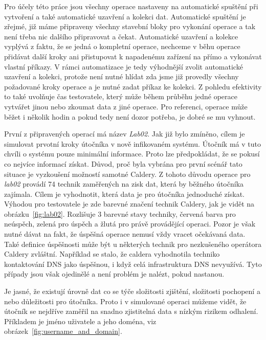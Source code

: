 Pro účely této práce jsou všechny operace nastaveny na automatické spuštění při vytvoření a také automatické uzavření a kolekci dat.
Automatické spuštění je zřejmé, již máme připraveny všechny stavební bloky pro vykonání operace a tak není třeba nic dalšího připravovat a čekat.
Automatické uzavření a kolekce vyplývá z faktu, že se jedná o kompletní operace, nechceme v běhu operace přidávat další kroky ani přistupovat k napadenému zařízení na přímo a vykonávat vlastní příkazy.
V rámci automatizace je tedy výhodnější zvolit automatické uzavření a kolekci, protože není nutné hlídat zda jsme již provedly všechny požadované kroky operace a je nutné zadat příkaz ke kolekci.
Z pohledu efektivity to také uvolňuje čas testovatele, který může během průběhu jedné operace vytvářet jinou nebo zkoumat data z jiné operace.
Pro referenci, operace může běžet i několik hodin a pokud tedy není dozor potřeba, je dobré se mu vyhnout.

První z připravených operací má název \textit{Lab02}.
Jak již bylo zmíněno, cílem je simulovat prvotní kroky útočníka v nově infikovaném systému.
Útočník má v tuto chvíli o systému pouze minimální informace.
Proto lze předpokládat, že se pokusí co nejvíce informací získat.
Důvod, proč byla vybrána pro první scénář tato situace je vyzkoušení možností samotné Caldery.
Z tohoto důvodu operace pro \textit{lab02} provádí 74 technik zaměřených na zisk dat, která by běžného útočníka zajímala.
Cílem je vyhodnotit, která data je pro útočníka jednoduché získat.
Výhodou pro testovatele je zde barevné značení technik Caldery, jak je vidět na obrázku~\ref{fig:lab02}.
Rozlišuje 3 barevné stavy techniky, červená barva pro neúspěch, zelená pro úspěch a žlutá pro právě provádějící operaci.
Pozor je však nutné dávat na fakt, že úspěšná operace nemusí vždy vracet očekávaná data.
Také definice úspěšnosti může být u některých technik pro nezkušeného operátora Caldery zvláštní.
Například se stalo, že caldera vyhodnotila techniko kontaktování \ac{DNS} jako úspěšnou, i když celá infrastruktura \ac{DNS} nevyužívá.
Tyto případy jsou však ojedinělé a není problém je nalézt, pokud nastanou.


Je jasné, že existují úrovně dat co se týče složitosti zjištění, složitosti pochopení a nebo důležitosti pro útočníka.
Proto i v simulované operaci můžeme vidět, že útočník se nejdříve zaměřil na snadno zjistitelná data s nízkým rizikem odhalení.
Příkladem je jméno uživatele a jeho doména, viz obrázek~\ref{fig:username_and_domain}.


